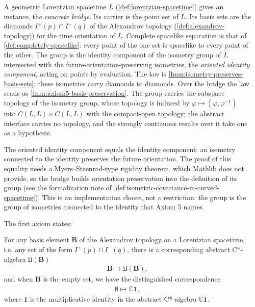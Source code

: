 \begin{definition}
    A geometric Lorentzian spacetime $L$ (\ref{def:lorentzian-spacetime}) gives an instance, the \emph{concrete bridge}. Its carrier is the point set of $L$. Its basis sets are the diamonds $I^+(p) \cap I^-(q)$ of the Alexandrov topology (\ref{def:alexandrov-topology}) for the time orientation of $L$. Complete spacelike separation is that of \ref{def:completely-spacelike}: every point of the one set is spacelike to every point of the other. The group is the identity component of the isometry group of $L$ intersected with the future-orientation-preserving isometries, the \emph{oriented identity component}, acting on points by evaluation. The law is \ref{lmm:isometry-preserves-basis-sets}: these isometries carry diamonds to diamonds. Over the bridge the law reads as \ref{lmm:axiom5-basis-preservation}. The group carries the subspace topology of the isometry group, whose topology is induced by $\varphi \mapsto (\varphi, \varphi^{-1})$ into $C(L,L) \times C(L,L)$ with the compact-open topology; the abstract interface carries no topology, and the strongly continuous results over it take one as a hypothesis.

    The oriented identity component equals the identity component: an isometry connected to the identity preserves the future orientation. The proof of this equality needs a Myers--Steenrod-type rigidity theorem, which Mathlib does not provide, so the bridge builds orientation preservation into the definition of its group (see the formalization note of \ref{def:isometric-covariance-in-curved-spacetime}). This is an implementation choice, not a restriction: the group is the group of isometries connected to the identity that Axiom 5 names.
\end{definition}

The first axiom states:

\begin{definition}
    \label{def:local-algebras-in-curved-spacetime}
    \leanok
    For any basis element $\mathbf{B}$ of the Alexandrov topology on a Lorentzian spacetime, i.e. any set of the form $I^+(p) \cap I^-(q)$, there is a corresponding abstract C*-algebra $\mathfrak{U}(\mathbf{B})$
    \begin{align}
        \mathbf{B} \longmapsto \mathfrak{U}(\mathbf{B}),
    \end{align}
    and when $\mathbf{B}$ is the empty set, we have the distinguished correspondence
    \begin{align}
        \emptyset \longmapsto \mathbb{C} \mathbf{1},
    \end{align}
    where $\mathbf{1}$ is the multiplicative identity in the abstract C*-algebra $\mathbb{C} \mathbf{1}$.
\end{definition}

